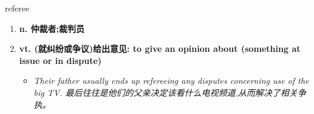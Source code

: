 
\begin{frame}
{\huge referee}
\begin{center}
\begin{enumerate}\Large
  \item \textbf{n. 仲裁者;裁判员}
  \item \textbf{vt. (就纠纷或争议)给出意见: to give an opinion about (something at issue or in dispute)}
  \begin{itemize}
    \item \em{\Large{Their father usually ends up refereeing any disputes concerning use of the big TV. 最后往往是他们的父亲决定该看什么电视频道,从而解决了相关争执。}}
  \end{itemize}
\end{enumerate}
\end{center}
\end{frame}
